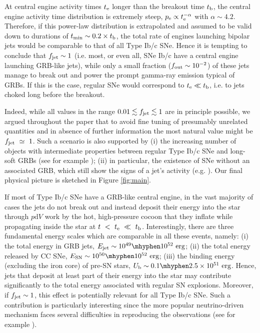 \documentclass[useAMS,usenatbib]{mn2e}
\begin{document}
At central engine activity times $t_{\rm e}$ longer than the breakout time $t_{\rm b}$, the central engine activity time distribution is extremely steep, $p_{\rm e}\propto t_{\rm e}^{-\alpha}$ with $\alpha\sim 4.2$. Therefore, if this power-law distribution is extrapolated and assumed to be valid down to durations of $t_{\rm min}\sim 0.2\times t_{\rm b}$, the total rate of engines launching bipolar jets would be comparable to that of all Type Ib/c SNe. Hence it is tempting to conclude that $f_{\rm jet}\sim 1$ (i.e. most, or even all, SNe Ib/c have a central engine launching GRB-like jets), while only a small fraction ($f_{\rm out}\sim 10^{-2}$) of these jets manage to break out and power the prompt gamma-ray emission typical of GRBs. If this is the case, regular SNe would correspond to $t_{\rm e}\ll t_{\rm b}$, i.e. to jets choked long before the breakout.

Indeed, while all values in the range $0.01\lesssim f_{\rm jet}\lesssim 1$ are in principle possible, we argued throughout the paper that to avoid fine tuning of presumably unrelated quantities and in absence of further information the most natural value might be  $f_{\rm jet}~\simeq~1$. Such a scenario is also supported by (i) the increasing number of objects with intermediate properties between regular Type Ib/c SNe and long-soft GRBs (see for example \citealt{Margutti2014}); (ii) in particular, the existence of SNe without an associated GRB, which still show the signs of a jet's activity (e.g. \citealt{GranotRamirez2004, Mazzali2005, Paragi2010}). Our final physical picture is sketched in Figure \ref{fig:main}.

If most of Type Ib/c SNe have a GRB-like central engine, in the vast majority of cases the jets do not break out and instead deposit their energy into the star through $p\text{d}V$ work by the hot, high-pressure cocoon that they inflate while propagating inside the star at $t~<~t_{\rm e}~\ll~t_{\rm b}$. Interestingly, there are three fundamental energy scales which are comparable in all these events, namely: (i) the total energy in GRB jets, $E_{\rm jet}\sim 10^{49}\mhyphen10^{52}\text{ erg}$; (ii) the total energy released by CC SNe, $E_{\rm SN}\sim 10^{50}\mhyphen10^{52}\text{ erg}$; (iii) the binding energy (excluding the iron core) of pre-SN stars, $U_{\rm b}\sim 0.1\mhyphen2.5\times 10^{51}\text{ erg}$. Hence, jets that deposit at least part of their energy into the star may contribute significantly to the total energy associated with regular SN explosions. Moreover, if $f_{\rm jet}\sim 1$, this effect is potentially relevant for all Type Ib/c SNe. Such a contribution is particularly interesting since the more popular neutrino-driven mechanism faces several difficulties in reproducing the observations (see for example \citealt{Papish2015}).
\end{document}
